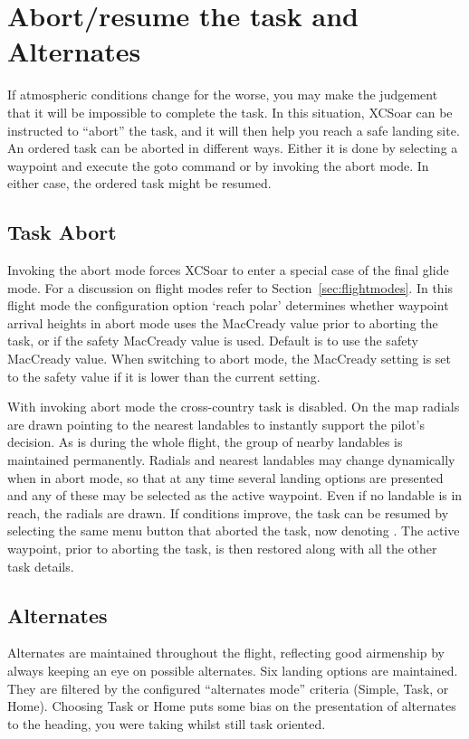 \section{Abort/resume the task and Alternates}

If atmospheric conditions change for the worse, you may make the
judgement that it will be impossible to complete the task.  In this
situation, XCSoar can be instructed to ``abort'' the task, and it will
then help you reach a safe landing site. An ordered task can be aborted in 
different ways. Either it is done by selecting a waypoint and execute the goto 
command or by invoking the abort mode. In either case, the ordered task might be resumed.

\subsection*{Task Abort}\label{sec:taskabort}
Invoking the abort mode forces XCSoar to enter a special case of the final glide mode.  For a discussion on 
flight modes refer to Section~\ref{sec:flightmodes}. In this flight mode
the configuration option `reach polar' determines whether
waypoint arrival heights in abort mode uses the MacCready value prior
to aborting the task, or if the safety MacCready value is used. 
Default is to use the safety MacCready value.  When switching to
abort mode, the MacCready setting is set to the safety value 
if it is lower than the current setting.

With invoking abort mode the cross-country task is disabled. On the map radials 
are drawn pointing to the nearest landables to instantly 
support the pilot's decision. As is during the whole flight, the group of nearby 
landables is maintained permanently. Radials and nearest landables may change 
dynamically when in abort mode, so that at any time several landing options are 
presented and any of these may be selected as the active waypoint. Even if no 
landable is in reach, the radials are drawn.
If conditions improve, the task can be resumed by selecting the same
menu button that aborted the task, now denoting . The active 
waypoint, prior to aborting the task, is then restored along with all the other 
task details.

\subsection*{Alternates}\label{sec:alternates}
Alternates are maintained throughout the flight, reflecting good airmenship by 
always keeping an eye on possible alternates. Six landing 
options are maintained. They are filtered by the configured ``alternates mode'' 
criteria (Simple, Task, or Home).  
Choosing Task or Home puts some bias on the presentation of alternates to the 
heading, you were taking whilst still task oriented.

